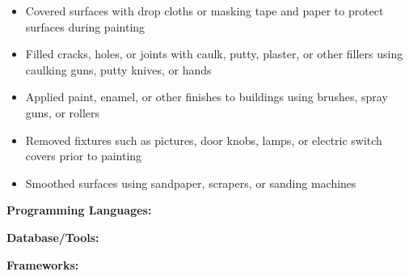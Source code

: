 \documentclass[10pt,a4paper,ragged2e,withhyper]{altacv}
\begin{document}
\begin{paracol}{2}
      \begin{itemize}
        \item Covered surfaces with drop cloths or masking tape and paper to protect surfaces during painting
        \item Filled cracks, holes, or joints with caulk, putty, plaster, or other fillers using caulking guns, putty knives, or hands
        \item Applied paint, enamel, or other finishes to buildings using brushes, spray guns, or rollers
        \item Removed fixtures such as pictures, door knobs, lamps, or electric switch covers prior to painting
        \item Smoothed surfaces using sandpaper, scrapers, or sanding machines
      \end{itemize}
      
      \divider




      \divider


      \switchcolumn


      \textbf{Programming Languages: }
      \newline
      \newline

      \textbf{Database/Tools:}
      \newline
      \newline

      \textbf{Frameworks:}
      \newline
      \newline
      
      \newline


\end{paracol}
\end{document}
